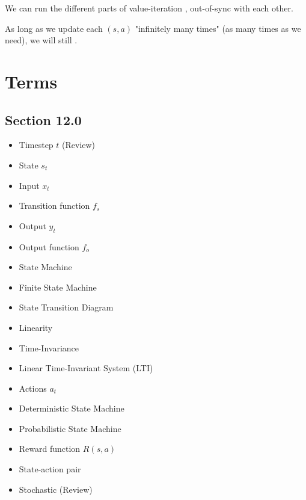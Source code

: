         \begin{concept}
            We can run the different parts of value-iteration , out-of-sync with each other.

            As long as we update each $(s,a)$ "infinitely many times" (as many times as we need), we will still .
        \end{concept}


\section{Terms}

    \subsection*{Section 12.0}

    \begin{itemize}
        \item Timestep $t$ (Review)
        \item State $s_t$
        \item Input $x_t$
        \item Transition function $f_s$
        \item Output $y_t$
        \item Output function $f_o$
        \item State Machine
        \item Finite State Machine
        \item State Transition Diagram
        \item Linearity 
        \item Time-Invariance
        \item Linear Time-Invariant System (LTI)
        \item Actions $a_t$
        \item Deterministic State Machine
        \item Probabilistic State Machine
        \item Reward function $R(s,a)$
        \item State-action pair
        \item Stochastic (Review)
    \end{itemize}

